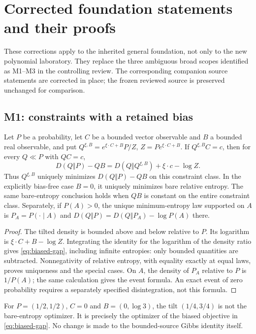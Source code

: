 \section{Corrected foundation statements and their proofs}\label{app:repairs}
These corrections apply to the inherited general foundation, not only to the
new polynomial laboratory. They replace the three ambiguous broad scopes
identified as M1--M3 in the controlling review. The corresponding companion
source statements are corrected in place; the frozen reviewed source is
preserved unchanged for comparison.

\subsection{M1: constraints with a retained bias}
\begin{proposition}\label{prop:biased}
Let $P$ be a probability, let $C$ be a bounded vector observable and $B$ a
bounded real observable, and put
$Q^{\xi,B}=e^{\xi\cdot C+B}P/Z$, $Z=P e^{\xi\cdot C+B}$.
If $Q^{\xi,B}C=c$, then for every $Q\ll P$ with $QC=c$,
\begin{equation}
 D(Q\Vert P)-QB=D(Q\Vert Q^{\xi,B})+\xi\cdot c-\log Z.
 \label{eq:biased-gap}
\end{equation}
Thus $Q^{\xi,B}$ uniquely minimizes $D(Q\Vert P)-QB$ on this constraint
class. In the explicitly bias-free case $B=0$, it uniquely minimizes bare
relative entropy. The same bare-entropy conclusion holds when $QB$ is
constant on the entire constraint class. Separately, if $P(A)>0$, the
unique minimum-entropy law supported on $A$ is $P_A=P(\cdot\mid A)$ and
$D(Q\Vert P)=D(Q\Vert P_A)-\log P(A)$ there.
\end{proposition}
\begin{proof}
The tilted density is bounded above and below relative to $P$. Its logarithm
is $\xi\cdot C+B-\log Z$. Integrating the identity for the logarithm of the
density ratio gives \eqref{eq:biased-gap}, including infinite entropies:
only bounded quantities are subtracted. Nonnegativity of relative entropy,
with equality exactly at equal laws, proves uniqueness and the special
cases. On $A$, the density of $P_A$ relative to $P$ is $1/P(A)$; the same
calculation gives the event formula. An exact event of zero probability
requires a separately specified disintegration, not this formula.
\end{proof}

For $P=(1/2,1/2)$, $C=0$ and $B=(0,\log3)$, the tilt $(1/4,3/4)$ is
not the bare-entropy optimizer. It is precisely the optimizer of the biased
objective in \eqref{eq:biased-gap}. No change is made to the bounded-source
Gibbs identity itself.

